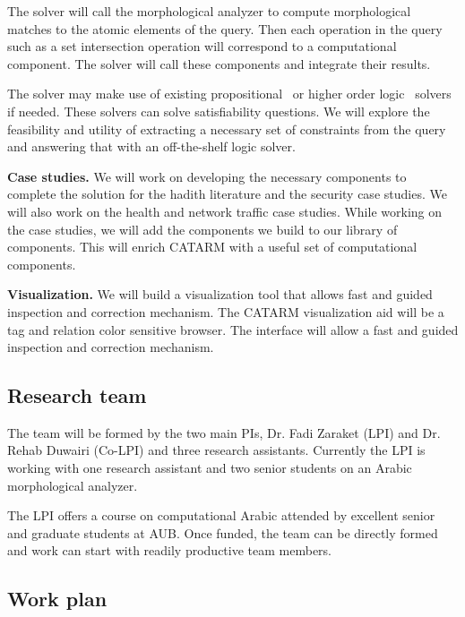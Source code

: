 \documentclass[12pt]{article}
\begin{document}
{The solver will call the morphological analyzer to compute 
morphological matches to the atomic elements of the query. 
Then each operation in the query such as a set intersection
operation will correspond to a computational component. 
The solver will call these components and integrate their
results. 

The solver may make use of existing 
propositional~\cite{MiniSAT04} or
higher order logic~\cite{Z308} solvers if needed. 
These solvers can solve satisfiability questions.
We will explore the feasibility and utility 
of extracting a necessary set of 
constraints from the query and answering that with an off-the-shelf
logic solver. 

{\bf Case studies.}
We will work on developing the necessary components to complete 
the solution for the hadith literature and the security case 
studies.
We will also work on the health and network traffic case studies.
While working on the case studies, we will add the components
we build to our library of components. 
This will enrich CATARM with a useful set of computational 
components. 

{\bf Visualization.} 
We will build a visualization tool that allows fast 
and guided inspection and correction mechanism. 
The CATARM visualization aid will be a tag and relation color
sensitive browser.
The interface will allow a fast and guided inspection and 
correction mechanism.

\subsection{Research team}

The team will be formed by the two main PIs, Dr. Fadi Zaraket (LPI)
and Dr. Rehab Duwairi (Co-LPI) and three research assistants.
Currently the LPI is working with one research assistant 
and two senior students on an Arabic morphological analyzer. 

The LPI offers a course on computational Arabic attended
by excellent senior and graduate students at AUB. 
Once funded, the team can be directly formed and work can start
with readily productive team members. 

\subsection{Work plan}
\label{s:design:plan}


}
\end{document}
